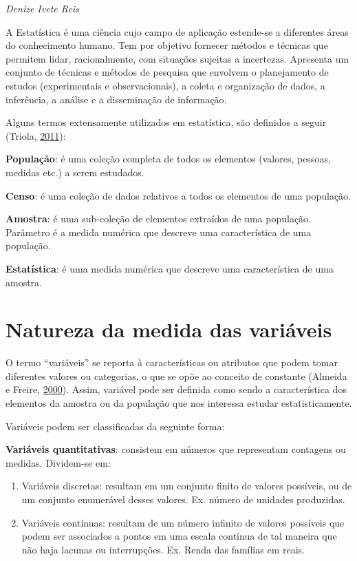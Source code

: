 \documentclass[12pt,brazil,oneside]{book}
\begin{document}
\emph{Denize Ivete Reis}

\begin{flushright}
\emph{}
\end{flushright}

A Estatística é uma ciência cujo campo de aplicação estende-se a diferentes áreas do conhecimento humano. Tem por objetivo fornecer métodos e técnicas que permitem lidar, racionalmente, com situações sujeitas a incertezas. Apresenta um conjunto de técnicas e métodos de pesquisa que envolvem o planejamento de estudos (experimentais e observacionais), a coleta e organização de dados, a inferência, a análise e a disseminação de informação.

Alguns termos extensamente utilizados em estatística, são definidos a seguir (Triola, \protect\hyperlink{ref-triola1999}{2011}):

\textbf{População}: é uma coleção completa de todos os elementos (valores, pessoas, medidas etc.) a serem estudados.

\textbf{Censo}: é uma coleção de dados relativos a todos os elementos de uma população.

\textbf{Amostra}: é uma sub-coleção de elementos extraídos de uma população.
Parâmetro é a medida numérica que descreve uma característica de uma população.

\textbf{Estatística}: é uma medida numérica que descreve uma característica de uma amostra.

\hypertarget{natureza-da-medida-das-variaveis}{%
\section{Natureza da medida das variáveis}\label{natureza-da-medida-das-variaveis}}

O termo ``variáveis'' se reporta à características ou atributos que podem tomar diferentes valores ou categorias, o que se opõe ao conceito de constante (Almeida e Freire, \protect\hyperlink{ref-almeida2000}{2000}). Assim, variável pode ser definida como sendo a característica dos elementos da amostra ou da população que nos interessa estudar estatisticamente.

Variáveis podem ser classificadas da seguinte forma:

\textbf{Variáveis quantitativas}: consistem em números que representam contagens ou medidas. Dividem-se em:

\begin{enumerate}
\def\labelenumi{\alph{enumi})}
\item
  Variáveis discretas: resultam em um conjunto finito de valores possíveis, ou de um conjunto enumerável desses valores. Ex. número de unidades produzidas.
\item
  Variáveis contínuas: resultam de um número infinito de valores possíveis que podem ser associados a pontos em uma escala contínua de tal maneira que não haja lacunas ou interrupções. Ex. Renda das famílias em reais.
\end{enumerate}
\end{document}
